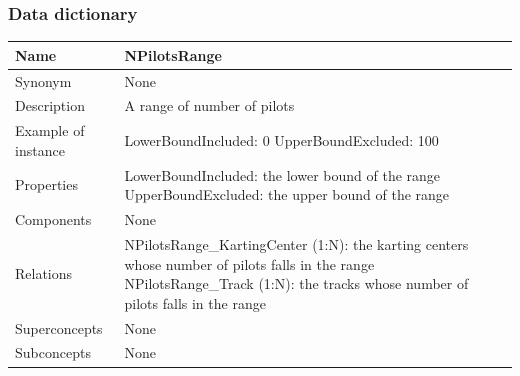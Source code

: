 \documentclass{beamer}
\begin{document}
\begin{frame}
    \frametitle{Data dictionary}
    \begin{table}
    \tiny
    \begin{tabular}{|p{2cm}|p{6cm}|}
    \hline
    Name & \textbf{NPilotsRange} \\
    \hline
    Synonym & None \\
    \hline
    Description & A range of number of pilots \\
    \hline
    Example of instance &
    LowerBoundIncluded: 0 \newline
    UpperBoundExcluded: 100 \\
    \hline
    Properties &
    LowerBoundIncluded: the lower bound of the range \newline
    UpperBoundExcluded: the upper bound of the range \\
    \hline
    Components & None \\
    \hline
    Relations &
    NPilotsRange\_KartingCenter (1:N): the karting centers whose number of pilots falls in the range \newline
    NPilotsRange\_Track (1:N): the tracks whose number of pilots falls in the range \\
    \hline
    Superconcepts & None \\
    \hline
    Subconcepts & None \\
    \hline
    \end{tabular}
    \end{table}
\end{frame}
\end{document}
